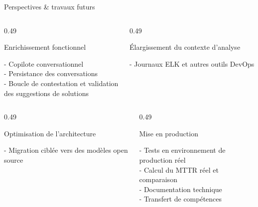 \documentclass{beamer}
\begin{document}
\begin{frame}{Perspectives \& travaux futurs}

\begin{columns}[T,onlytextwidth]

    \begin{column}{0.49\textwidth}
        \begin{persocard}{Enrichissement fonctionnel}
            \begin{minipage}[t][2cm][t]{\linewidth}
                - Copilote conversationnel\\[4pt]
                - Persistance des conversations\\[4pt]
                - Boucle de contestation et validation\\
                des suggestions de solutions
            \end{minipage}
        \end{persocard}
    \end{column}

    \begin{column}{0.49\textwidth}
        \begin{persocard}{Élargissement du contexte d'analyse}
            \begin{minipage}[t][1.9cm][t]{\linewidth}
                - Journaux ELK et autres outils DevOps
            \end{minipage}
        \end{persocard}
    \end{column}

\end{columns}

\vspace{0.5cm}

\begin{columns}[T,onlytextwidth]

    \begin{column}{0.49\textwidth}
        \begin{persocard}{Optimisation de l'architecture}
            \begin{minipage}[t][2cm][t]{\linewidth}
                - Migration ciblée vers des modèles open source
            \end{minipage}
        \end{persocard}
    \end{column}

    \begin{column}{0.49\textwidth}
        \begin{persocard}{Mise en production}
            \begin{minipage}[t][2cm][t]{\linewidth}
                - Tests en environnement de production réel\\[4pt]
                - Calcul du MTTR réel et comparaison\\[4pt]
                - Documentation technique\\[4pt]
                - Transfert de compétences
            \end{minipage}
        \end{persocard}
    \end{column}


\end{columns}
\end{frame}
\end{document}
